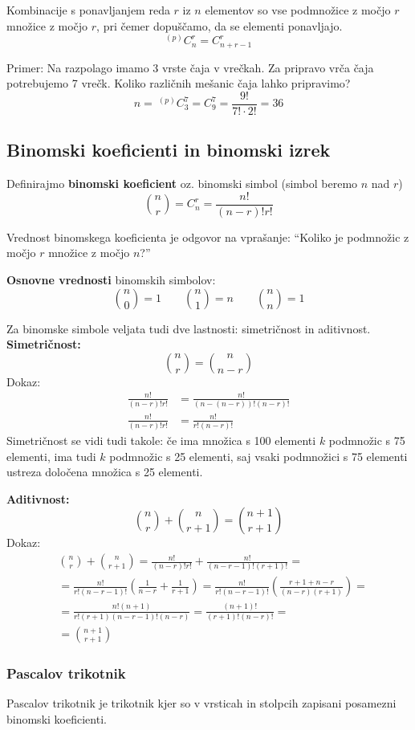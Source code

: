 \documentclass[a4paper,oneside,12pt,fleqn]{article}
\newcommand\krat\cdot
\numberwithin{equation}{section}
\begin{document}
Kombinacije s ponavljanjem reda $r$ iz $n$ elementov so vse podmnožice z močjo $r$ množice
z močjo $r$, pri čemer dopuščamo, da se elementi ponavljajo.
\[ ^{(p)}C_n^r = C_{n+r-1}^r \]

Primer: Na razpolago imamo 3 vrste čaja v vrečkah. Za pripravo vrča čaja
potrebujemo 7 vrečk. Koliko različnih mešanic čaja lahko pripravimo?
\[ n =\ ^{(p)}C_3^7 = C_9^7 = \frac{9!}{7!\krat 2!} = 36 \]

\subsection{Binomski koeficienti in binomski izrek}
\label{sec:komb:bin}

Definirajmo \textbf{binomski koeficient} oz. binomski simbol (simbol beremo $n$ nad $r$)
\[ \binom{n}{r} = C^r_n = \frac{n!}{(n-r)!r!} \]

Vrednost binomskega koeficienta je odgovor na vprašanje: ``Koliko je podmnožic z močjo $r$
množice z močjo $n$?''

\textbf{Osnovne vrednosti} binomskih simbolov: 
\[ \binom{n}{0} = 1 \qquad \binom{n}{1} = n \qquad \binom{n}{n} = 1 \]

Za binomske simbole veljata tudi dve lastnosti: simetričnost in aditivnost. \\
\textbf{Simetričnost:}
\[ \binom{n}{r} = \binom{n}{n-r} \]
Dokaz:
\begin{align*}
  \frac{n!}{(n-r)!r!} &= \frac{n!}{(n-(n-r))!(n-r)!} \\
  \frac{n!}{(n-r)!r!} &= \frac{n!}{r!(n-r)!}
\end{align*}
Simetričnost se vidi tudi takole: če ima množica s 100 elementi $k$ podmnožic s 75 elementi, ima
tudi $k$ podmnožic s 25 elementi, saj vsaki podmnožici s 75 elementi ustreza določena množica s 25
elementi.

\textbf{Aditivnost:}
\[ \binom{n}{r} + \binom{n}{r+1} = \binom{n+1}{r+1} \]
Dokaz:
\begin{align*}
  &\binom{n}{r} + \binom{n}{r+1} = \frac{n!}{(n-r)!r!} + \frac{n!}{(n-r-1)!(r+1)!} = \\
  &= \frac{n!}{r!(n-r-1)!}\left( \frac{1}{n-r} + \frac{1}{r+1} \right) =
  \frac{n!}{r!(n-r-1)!}\left( \frac{r+1+n-r}{(n-r)(r+1)} \right) = \\
  &= \frac{n!(n+1)}{r!(r+1)(n-r-1)!(n-r)} = \frac{(n+1)!}{(r+1)!(n-r)!} = \\
  &= \binom{n+1}{r+1}
\end{align*}

\subsubsection{Pascalov trikotnik}
\label{sec:komb:bin:pasc}
Pascalov trikotnik je trikotnik kjer so v vrsticah in stolpcih zapisani posamezni binomski koeficienti.
\end{document}
